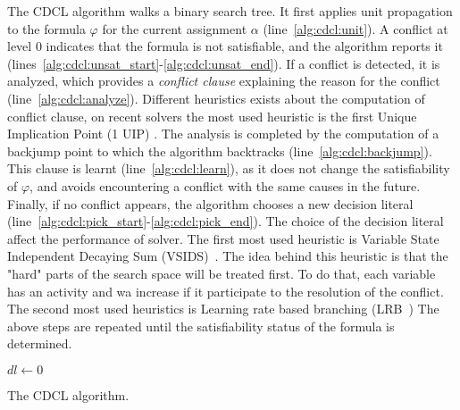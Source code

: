 The CDCL algorithm walks a binary search tree.  It first applies unit propagation to
the formula $\varphi$ for the current assignment $\alpha$ (line~\ref{alg:cdcl:unit}).
A conflict at level $0$ indicates that the formula is not satisfiable, and the algorithm
reports it (lines~\ref{alg:cdcl:unsat_start}-\ref{alg:cdcl:unsat_end}).
If a conflict is detected, it is analyzed, which provides a \emph{conflict clause} 
explaining the reason for the conflict (line~\ref{alg:cdcl:analyze}).
Different heuristics exists about the computation of conflict clause, on recent solvers
the most used heuristic is the first Unique Implication Point (1 UIP) \cite{zhang2001efficient}.
The analysis is completed by the computation of a
backjump point to which the algorithm backtracks (line~\ref{alg:cdcl:backjump}).
  This clause is learnt (line~\ref{alg:cdcl:learn}), as it does not change the
satisfiability of $\varphi$, and avoids encountering a conflict with the same
causes in the future.
Finally, if no conflict appears, the algorithm chooses a new decision literal 
(line~\ref{alg:cdcl:pick_start}-\ref{alg:cdcl:pick_end}). The choice of the decision literal
affect the performance of solver. The first most used heuristic is Variable State Independent Decaying Sum (VSIDS)~\cite{moskewicz2001chaff}. The idea behind this heuristic is that the "hard" parts of the search space 
will be treated first. To do that, each variable has an activity and wa increase if it participate to the resolution
of the conflict.
The second most used heuristics is Learning rate based branching (LRB~\cite{liang2016learning})
The above steps are repeated until the satisfiability status of the formula is determined.


\begin{algorithm}
	{
		$dl \gets 0$ 
		\Return \true
	}
	\caption{The CDCL algorithm.}
	\label{algo:cdcl}
	
\end{algorithm}

